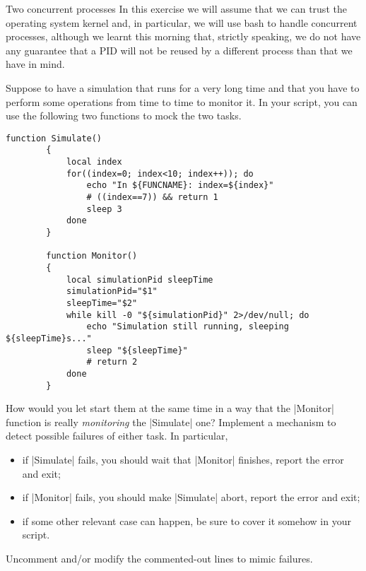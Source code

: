 
\begin{exercise}[Inspirational]{Two concurrent processes}
    In this exercise we will assume that we can trust the operating system kernel and, in particular, we will use bash to handle concurrent processes, although we learnt this morning that, strictly speaking, we do not have any guarantee that a PID will not be reused by a different process than that we have in mind.
    
    Suppose to have a simulation that runs for a very long time and that you have to perform some operations from time to time to monitor it.
    In your script, you can use the following two functions to mock the two tasks.
    \begin{lstlisting}[style=myBash, numbers=none]
        function Simulate()
        {
            local index
            for((index=0; index<10; index++)); do
                echo "In ${FUNCNAME}: index=${index}"
                # ((index==7)) && return 1
                sleep 3
            done
        }

        function Monitor()
        {
            local simulationPid sleepTime
            simulationPid="$1"
            sleepTime="$2"
            while kill -0 "${simulationPid}" 2>/dev/null; do
                echo "Simulation still running, sleeping ${sleepTime}s..."
                sleep "${sleepTime}"
                # return 2
            done
        }
    \end{lstlisting}
    How would you let start them at the same time in a way that the \bash|Monitor| function is really \emph{monitoring} the \bash|Simulate| one?
    Implement a mechanism to detect possible failures of either task.
    In particular,
    \begin{itemize}
        \item if \bash|Simulate| fails, you should wait that \bash|Monitor| finishes, report the error and exit;
        \item if \bash|Monitor| fails, you should make \bash|Simulate| abort, report the error and exit;
        \item if some other relevant case can happen, be sure to cover it somehow in your script.
    \end{itemize}
    Uncomment and/or modify the commented-out lines to mimic failures.
\end{exercise}